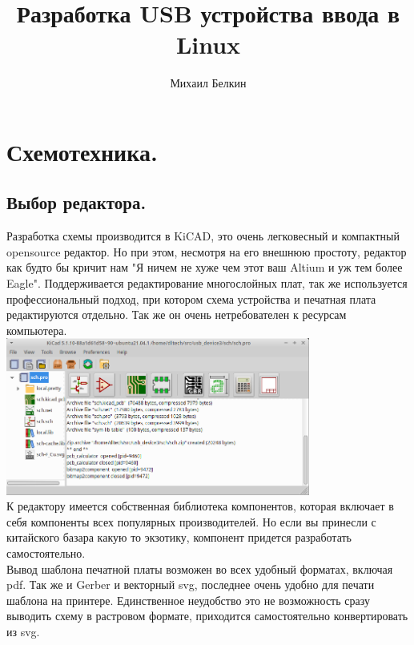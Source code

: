 \documentclass[12pt,a4paper]{article}
\begin{document}
\begin{titlepage}
\title{Разработка USB устройства ввода в Linux}
\author{Михаил Белкин}
\maketitle
\end{titlepage}

\tableofcontents
\newpage

\section{Схемотехника.}
\subsection{Выбор редактора.}
    Разработка схемы производится в KiCAD, это очень легковесный и компактный
    opensource редактор. Но при этом, несмотря на его внешнюю простоту, редактор
    как будто бы кричит нам "Я ничем не хуже чем этот ваш Altium и уж тем более
    Eagle". Поддерживается редактирование многослойных плат, так же используется
    профессиональный подход, при котором схема устройства и печатная плата
    редактируются отдельно. Так же он очень нетребователен к ресурсам
    компьютера.\\
\includegraphics[width=10cm]{kicad1.png}\\
    К редактору имеется собственная библиотека компонентов, которая включает в
    себя компоненты всех популярных производителей. Но если вы принесли
    с китайского базара какую то экзотику, компонент придется разработать
    самостоятельно.\\
    Вывод шаблона печатной платы возможен во всех удобный форматах, включая pdf.
    Так же и Gerber и векторный svg, последнее очень удобно для печати шаблона
    на принтере. Единственное неудобство это не возможность сразу выводить схему
    в растровом формате, приходится самостоятельно конвертировать из svg.
\end{document}
